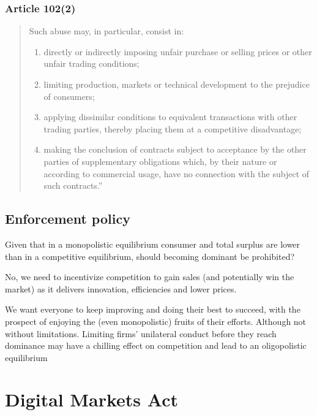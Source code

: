     \subsubsection{Article 102(2)}

        \begin{quote}
            Such abuse may, in particular, consist in:
            \begin{enumerate}[label=\alph*.]
                \item directly or indirectly imposing unfair purchase or selling prices or other unfair trading conditions; 
                \item limiting production, markets or technical development to the prejudice of consumers;
                \item applying dissimilar conditions to equivalent transactions with other trading parties, thereby placing them at a competitive disadvantage;
                \item making the conclusion of contracts subject to acceptance by the other parties of supplementary obligations which, by their nature or according to commercial usage, have no connection with the subject of such contracts.”
            \end{enumerate}
        \end{quote}

    \subsection{Enforcement policy}

        Given that in a monopolistic equilibrium consumer and total surplus are lower than in a competitive equilibrium, should becoming dominant be prohibited?

\noindent
        No, we need to incentivize competition to gain sales (and potentially win the market) as it delivers innovation, efficiencies and lower prices.


        We want everyone to keep improving and doing their best to succeed, with the prospect of enjoying the (even monopolistic) fruits of their efforts. Although not without limitations. Limiting firms’ unilateral conduct before they reach dominance may have a chilling effect on competition and lead to an oligopolistic equilibrium

\section{Digital Markets Act}

